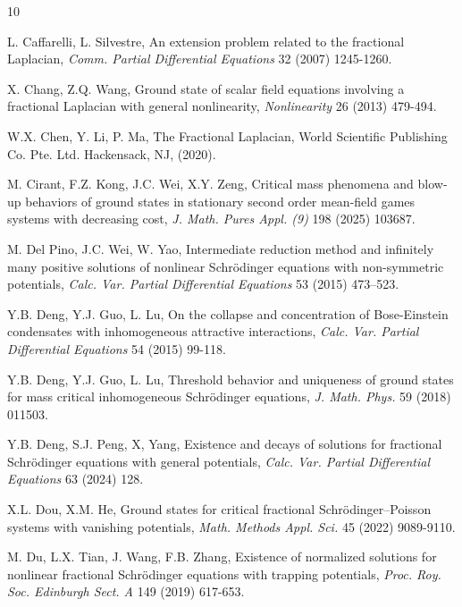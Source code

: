 \documentclass[reqno, 11pt]{amsart} %
\numberwithin{equation}{section}
\begin{document}
	\begin{thebibliography}{10}
		
			L. Caffarelli, L. Silvestre,
		An extension problem related to the fractional Laplacian, {\em Comm. Partial Differential Equations} 32 (2007) 1245-1260.
		
		X. Chang, Z.Q. Wang,
		Ground state of scalar field equations involving a fractional Laplacian with general nonlinearity, {\em Nonlinearity} 26 (2013) 479-494.
		
		W.X. Chen, Y. Li, P. Ma,
		The Fractional Laplacian, World Scientific Publishing Co. Pte. Ltd. Hackensack, NJ, (2020).
		
		M. Cirant, F.Z. Kong, J.C. Wei, X.Y. Zeng,
		Critical mass phenomena and blow-up behaviors of ground states in stationary second order mean-field games systems with decreasing cost,
		{\em J. Math. Pures Appl. (9)} 198 (2025) 103687.
		
		
		
        
		
		 M. Del Pino, J.C. Wei, W. Yao, Intermediate reduction method and infinitely many positive solutions of nonlinear Schr\"{o}dinger equations with non-symmetric potentials,
		{\em Calc. Var. Partial Differential Equations} 53 (2015) 473–523.
		
		
		
		Y.B. Deng, Y.J. Guo, L. Lu,
		On the collapse and concentration of Bose-Einstein condensates with inhomogeneous attractive interactions,
		{\em Calc. Var. Partial Differential Equations} 54 (2015) 99-118.
		
		Y.B. Deng, Y.J. Guo, L. Lu,
		Threshold behavior and uniqueness of ground states for mass critical inhomogeneous Schr\"{o}dinger equations,
		{\em J. Math. Phys.} 59 (2018) 011503.
		
		Y.B. Deng, S.J. Peng, X, Yang,
		Existence and decays of solutions for fractional Schr\"{o}dinger equations with general potentials,
		{\em Calc. Var. Partial Differential Equations} 63 (2024) 128.
		
		X.L. Dou, X.M. He,
		Ground states for critical fractional Schr\"{o}dinger–Poisson systems with vanishing potentials, {\em Math. Methods Appl. Sci.} 45 (2022) 9089-9110.
		
		
		M. Du, L.X. Tian, J. Wang, F.B. Zhang,
		Existence of normalized solutions for nonlinear fractional Schr\"{o}dinger equations with trapping potentials, {\em Proc. Roy. Soc. Edinburgh Sect. A} 149 (2019) 617-653.
		

\end{thebibliography}
\end{document}
